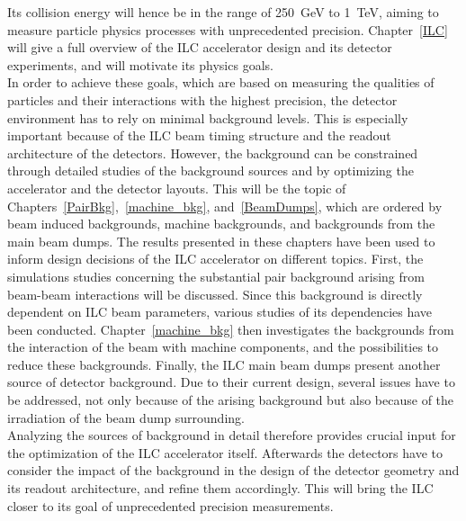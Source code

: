 Its collision energy will hence be in the range of \SI{250}{\GeV} to \SI{1}{\TeV}, aiming to measure particle physics processes with unprecedented precision.
Chapter~\ref{ILC} will give a full overview of the ILC accelerator design and its detector experiments, and will motivate its physics goals.
\\In order to achieve these goals, which are based on measuring the qualities of particles and their interactions with the highest precision, the detector environment has to rely on minimal background levels.
This is especially important because of the ILC beam timing structure and the readout architecture of the detectors.
However, the background can be constrained through detailed studies of the background sources and by optimizing the accelerator and the detector layouts.
This will be the topic of Chapters~\ref{PairBkg},~\ref{machine_bkg}, and~\ref{BeamDumps}, which are ordered by beam induced backgrounds, machine backgrounds, and backgrounds from the main beam dumps.
The results presented in these chapters have been used to inform design decisions of the ILC accelerator on different topics.
First, the simulations studies concerning the substantial \positron\electron pair background arising from beam-beam interactions will be discussed.
Since this background is directly dependent on ILC beam parameters, various studies of its dependencies have been conducted.
Chapter~\ref{machine_bkg} then investigates the backgrounds from the interaction of the beam with machine components, and the possibilities to reduce these backgrounds.
Finally, the ILC main beam dumps present another source of detector background.
Due to their current design, several issues have to be addressed, not only because of the arising background but also because of the irradiation of the beam dump surrounding.
\\Analyzing the sources of background in detail therefore provides crucial input for the optimization of the ILC accelerator itself.
Afterwards the detectors have to consider the impact of the background in the design of the detector geometry and its readout architecture, and refine them accordingly.
This will bring the ILC closer to its goal of unprecedented precision measurements.